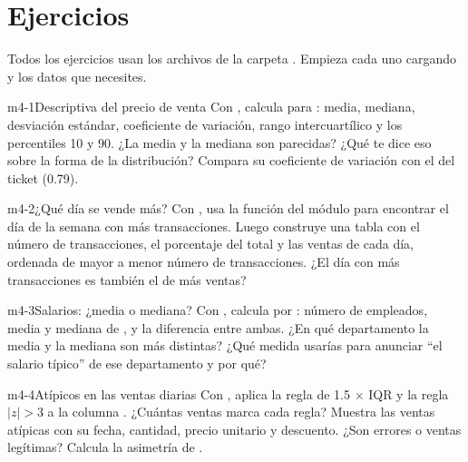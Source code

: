 \section{Ejercicios}
\label{sec:m4-ejercicios}

Todos los ejercicios usan los archivos de la carpeta .
Empieza cada uno cargando  y los datos que necesites.

\begin{ejercicio}{m4-1}{Descriptiva del precio de venta}
Con , calcula para : media,
mediana, desviación estándar, coeficiente de variación, rango
intercuartílico y los percentiles 10 y 90. ¿La media y la mediana son
parecidas? ¿Qué te dice eso sobre la forma de la distribución? Compara su
coeficiente de variación con el del ticket (0.79).
\end{ejercicio}

\begin{ejercicio}{m4-2}{¿Qué día se vende más?}
Con , usa la función  del módulo
para encontrar el día de la semana con más transacciones. Luego construye una
tabla con el número de transacciones, el porcentaje del total y las ventas
de cada día, ordenada de mayor a menor número de transacciones. ¿El día con
más transacciones es también el de más ventas?
\end{ejercicio}

\begin{ejercicio}{m4-3}{Salarios: ¿media o mediana?}
Con , calcula por : número de
empleados, media y mediana de , y la diferencia
entre ambas. ¿En qué departamento la media y la mediana son más distintas?
¿Qué medida usarías para anunciar ``el salario típico'' de ese departamento
y por qué?
\end{ejercicio}

\begin{ejercicio}{m4-4}{Atípicos en las ventas diarias}
Con , aplica la regla de 1.5 $\times$ IQR y la
regla $|z| > 3$ a la columna . ¿Cuántas ventas marca cada
regla? Muestra las ventas atípicas con su fecha, cantidad,
precio unitario y descuento. ¿Son errores o ventas legítimas? Calcula la
asimetría de .
\end{ejercicio}

